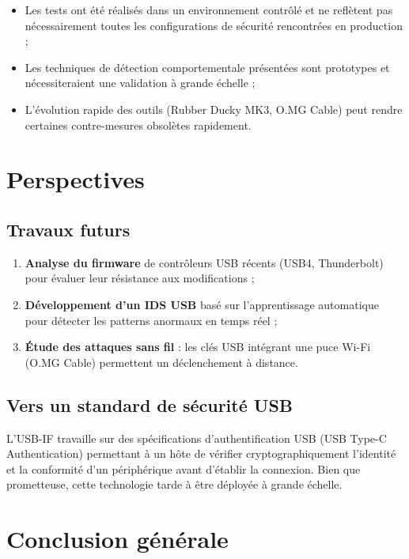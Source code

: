 \documentclass[12pt,a4paper]{report}
\begin{document}
\begin{itemize}
  \item Les tests ont été réalisés dans un environnement contrôlé et ne reflètent pas nécessairement toutes les configurations de sécurité rencontrées en production ;
  \item Les techniques de détection comportementale présentées sont prototypes et nécessiteraient une validation à grande échelle ;
  \item L'évolution rapide des outils (Rubber Ducky MK3, O.MG Cable) peut rendre certaines contre-mesures obsolètes rapidement.
\end{itemize}

\section{Perspectives}

\subsection{Travaux futurs}

\begin{enumerate}
  \item \textbf{Analyse du firmware} de contrôleurs USB récents (USB4, Thunderbolt) pour évaluer leur résistance aux modifications ;
  \item \textbf{Développement d'un IDS USB} basé sur l'apprentissage automatique pour détecter les patterns anormaux en temps réel ;
  \item \textbf{Étude des attaques sans fil} : les clés USB intégrant une puce Wi-Fi (O.MG Cable) permettent un déclenchement à distance.
\end{enumerate}

\subsection{Vers un standard de sécurité USB}

L'USB-IF travaille sur des spécifications d'authentification USB (USB Type-C Authentication) permettant à un hôte de vérifier cryptographiquement l'identité et la conformité d'un périphérique avant d'établir la connexion. Bien que prometteuse, cette technologie tarde à être déployée à grande échelle.

\section{Conclusion générale}
\end{document}
